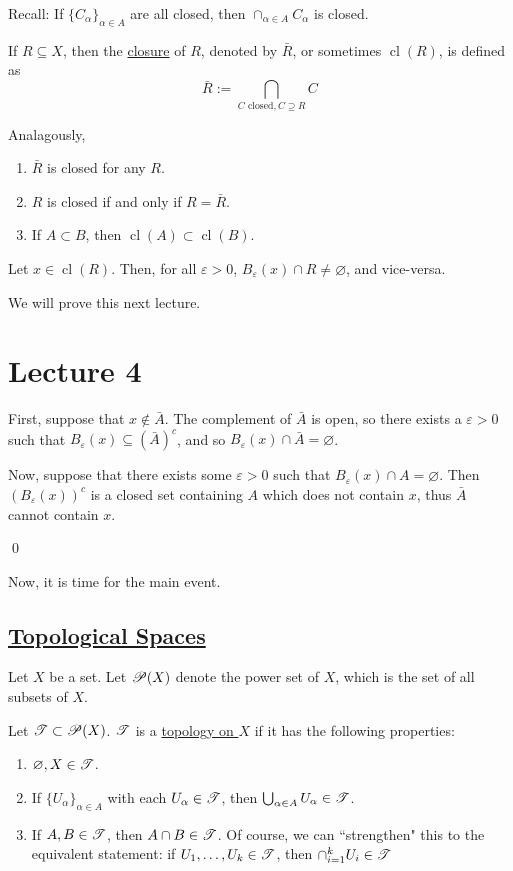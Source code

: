 \documentclass[x11names,reqno,14pt]{extarticle}
\DeclareMathOperator{\cl}{cl}
\begin{document}
Recall: If $\{C_\alpha\}_{\alpha\in A}$ are all closed, then $\cap_{\alpha\in A}C_\alpha$ is closed. 


If $R\subseteq X$, then the \underline{closure} of $R$, denoted by $\bar{R}$, or sometimes $\cl(R)$, is defined as 
\[
\bar{R}:= \bigcap_{C\text{ closed}, C\supseteq R}C
\]

Analagously, 
\begin{enumerate}
\item $\bar{R}$ is closed for any $R$. 
\item $R$ is closed if and only if $R = \bar{R}$. 
\item If $A \subset B$, then $\cl(A) \subset \cl(B)$. 
\end{enumerate}

\prop

Let $x \in \cl(R)$. Then, for all $\varepsilon>0$, $B_\varepsilon(x)\cap R \neq \varnothing$, and vice-versa. 

We will prove this next lecture. 

\section*{Lecture 4}

\proof 

First, suppose that $x\not\in \bar{A}$. The complement of $\bar{A}$ is open, so there exists a $\varepsilon>0$ such that $B_{\varepsilon}(x)\subseteq (\bar{A})^c$, and so $B_{\varepsilon}(x) \cap \bar{A} = \varnothing$. 

Now, suppose that there exists some $\varepsilon> 0$ such that $B_{\varepsilon}(x) \cap A = \varnothing$. Then $(B_{\varepsilon}(x))^c$ is a closed set containing $A$ which does not contain $x$, thus $\bar{A}$ cannot contain $x$. 

\qed

Now, it is time for the main event. 

\subsection*{\underline{Topological Spaces}}

Let $X$ be a set. Let $\mathscr{P}(X)$ denote the power set of $X$, which is the set of all subsets of $X$. 


Let $\mathscr{T} \subset\mathscr{P}(X)$. $\mathscr{T}$ is a \underline{topology on $X$} if it has the following properties: 
\begin{enumerate}
\item $\varnothing, X \in \mathscr{T}$. 
\item If $\{U_\alpha\}_{\alpha\in A}$ with each $U_\alpha \in \mathscr{T}$, then $\bigcup_{\alpha\in A}U_\alpha \in \mathscr{T}$. 
\item If $A, B \in \mathscr{T}$, then $A \cap B \in \mathscr{T}$. Of course, we can ``strengthen" this to the equivalent statement: if $U_1, \dots, U_k \in \mathscr{T}$, then $\cap_{i=1}^kU_i \in \mathscr{T}$
\end{enumerate}
\end{document}
